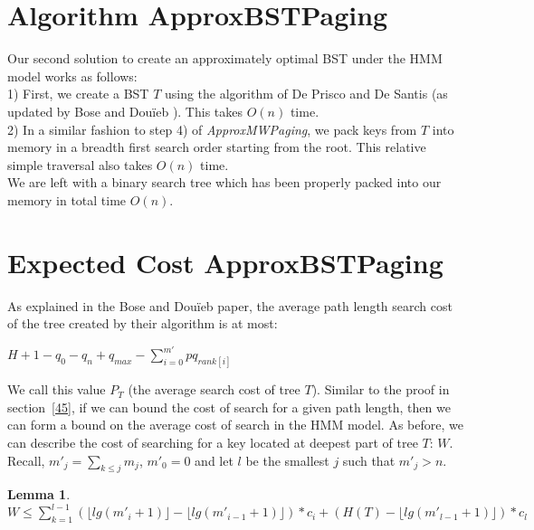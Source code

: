 \documentclass[letterpaper,12pt,titlepage,oneside,final]{book}
\theoremstyle{plain}
\newtheorem{lem}[thm]{Lemma}
\begin{document}
\section{Algorithm ApproxBSTPaging}\label{Algorithm ApproxBSTPaging}

Our second solution to create an approximately optimal BST under the HMM model works as follows: \\

1) First, we create a BST $T$ using the algorithm of De Prisco and De Santis \cite{de1993binary} (as updated by Bose and Dou\"{i}eb \cite{bose2009efficient}). This takes $O(n)$ time. \\

2) In a similar fashion to step 4) of \textit{ApproxMWPaging}, we pack keys from $T$ into memory in a breadth first search order starting from the root. This relative simple traversal also takes $O(n)$ time. \\

We are left with a binary search tree which has been properly packed into our memory in total time $O(n)$.


\section{Expected Cost ApproxBSTPaging}\label{48}

As explained in the Bose and Dou\"{i}eb paper, the average path length search cost of the tree created by their algorithm is at most: \cite{bose2009efficient}
\begin{center}
$H + 1 - q_0 - q_n + q_{max} - \sum_{i=0}^{m'} pq_{rank[i]}$
\end{center}

We call this value $P_T$ (the average search cost of tree $T$). Similar to the proof in section~\ref{45}, if we can bound the cost of search for a given path length, then we can form a bound on the average cost of search in the HMM model. As before, we can describe the cost of searching for a key located at deepest part of tree $T$: $W$. Recall, $m'_j = \sum_{k \leq j} m_j$, $m'_0 = 0$ and let $l$ be the smallest $j$ such that $m'_j > n$.

\begin{lem} \hspace{1cm} \\
$W \leq \sum_{k=1}^{l-1} (\lfloor lg(m'_i+1) \rfloor - \lfloor lg(m'_{i-1}+1) \rfloor)*c_i+ (H(T) - \lfloor lg(m'_{l-1}+1) \rfloor)*c_l$ 
\end{lem}
\end{document}
